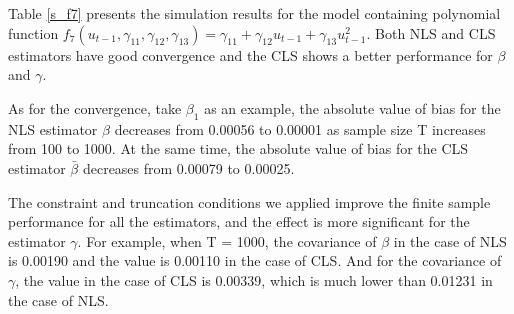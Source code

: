 \documentclass[a4paper,12pt,times,numbered,print,index]{report}
\numberwithin{equation}{section}
\begin{document}
Table \ref{s_f7} presents the simulation results for the model containing polynomial function $f_{7}\left( u_{t-1},\gamma_{11}, \gamma_{12}, \gamma_{13}\right) = \gamma_{11}+ \gamma_{12}u_{t-1}+\gamma_{13}u_{t-1}^{2}$. Both NLS and CLS estimators have good convergence and the CLS shows a better performance for $\beta$ and $\gamma$. 

As for the convergence, take $\beta_{1}$ as an example, the absolute value of bias for the NLS estimator $\hat{\beta}$ decreases from 0.00056 to 0.00001 as sample size T increases from 100 to 1000. At the same time, the absolute value of bias for the CLS estimator $\bar{\beta}$ decreases from 0.00079 to 0.00025. 

The constraint and truncation conditions we applied improve the finite sample performance for all the estimators, and the effect is more significant for the estimator $\gamma$. For example, when T = 1000, the covariance of $\beta$ in the case of NLS is 0.00190 and the value is 0.00110 in the case of CLS. And for the covariance of $\gamma$, the value in the case of CLS is 0.00339, which is much lower than 0.01231 in the case of NLS.
\end{document}
